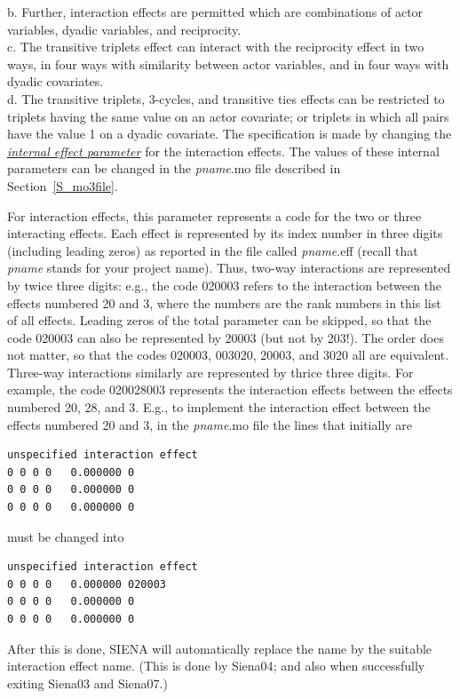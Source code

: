 \documentclass[a4paper,fleqn,11pt]{article}
\newcommand{\+}{\, + \,}
\newcommand{\SI}{{\sf SIENA }}
\begin{document}
{\iffalse

  b. Further, interaction effects are permitted
  which are combinations of actor variables, dyadic variables, and reciprocity.\\
  c. The transitive triplets effect can interact with the reciprocity effect in two ways,
  in four ways with similarity between actor variables, and in four ways with dyadic covariates.\\
  d. The transitive triplets, 3-cycles, and transitive ties effects
  can be restricted to triplets having the same value on an actor covariate;
  or triplets in which all pairs have the value 1 on a dyadic covariate.
The specification is made by changing the
\hyperlink{T_effpar}{\emph{internal effect parameter}}
for the interaction effects.
The values of these internal parameters
can be changed in the \textsf{{\em pname}.mo} file
described in Section~\ref{S_mo3file}.

For interaction effects, this parameter represents a code
for the two or three interacting effects.
Each effect is represented by its index number
in three digits (including leading zeros)
as reported in the file called \textsf{{\em pname}.eff}
(recall that \textsf{{\em pname}} stands for your project name).
Thus, two-way interactions are represented by twice three digits: e.g., the code 020003
refers to the interaction between the effects numbered 20 and 3,
where the numbers are the rank numbers in this list of all effects.
Leading zeros of the total parameter can be skipped, so that the code 020003
can also be represented by 20003 (but not by 203!). The order does not matter, so that
the codes 020003, 003020, 20003, and 3020 all are equivalent.
Three-way interactions similarly are represented by thrice three digits.
For example, the code 020028003 represents the interaction effects
between the effects numbered 20, 28, and 3.
E.g., to implement the interaction effect between the effects numbered 20 and 3,
in the \textsf{{\em pname}.mo} file the lines that initially are
\begin{verbatim}
unspecified interaction effect
0 0 0 0   0.000000 0
0 0 0 0   0.000000 0
0 0 0 0   0.000000 0
\end{verbatim}
must be changed into
\begin{verbatim}
unspecified interaction effect
0 0 0 0   0.000000 020003
0 0 0 0   0.000000 0
0 0 0 0   0.000000 0
\end{verbatim}
After this is done, \SI will automatically replace the name
by the suitable interaction effect name.
(This is done by \textsf{Siena04};
and also when successfully exiting \textsf{Siena03} and \textsf{Siena07}.)
\medskip

}
\end{document}
